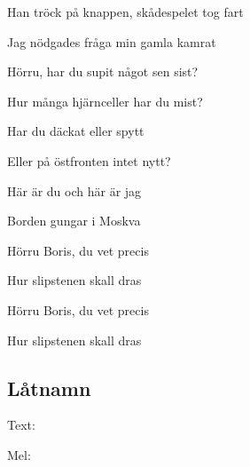 Han tröck på knappen, skådespelet tog fart

Jag nödgades fråga min gamla kamrat\bigskip


Hörru, har du supit något sen sist?

Hur många hjärnceller har du mist?

Har du däckat eller spytt

Eller på östfronten intet nytt?

Här är du och här är jag

Borden gungar i Moskva

Hörru Boris, du vet precis

Hur slipstenen skall dras\bigskip


Hörru Boris, du vet precis

Hur slipstenen skall dras

\bigskip

\subsection{\textbf{Låtnamn}}

Text: 

Mel: \bigskip
\newpage